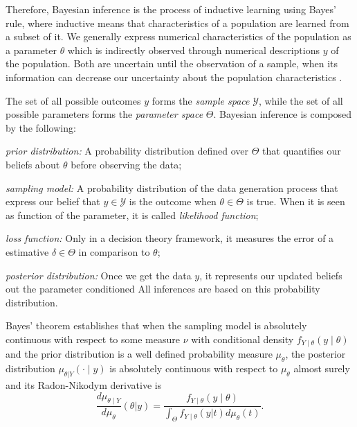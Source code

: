 Therefore, Bayesian inference is the process of inductive learning using
Bayes' rule, where inductive means that characteristics of a population are 
learned from a subset of it. We generally
express numerical characteristics of the population as a parameter $\theta$ which is
indirectly observed through numerical descriptions $y$ of the population. Both are
uncertain until the observation of a sample, when its information can decrease
our uncertainty about the population characteristics \cite[p. 1-2]{hoff2009first}.

The set of all possible outcomes $y$ forms the {\em sample space}
$\mathcal{Y}$, while the set of all possible parameters forms the {\em
parameter space} $\Theta$. Bayesian inference is composed by the following: 

\begin{alineas}
    \item {\em prior distribution:} A probability distribution defined over 
    $\Theta$ that quantifies our beliefs about $\theta$ before observing the data;
    \item {\em sampling model: } A probability distribution of the data generation process
    that express our belief that $y \in \mathcal{Y}$ is the outcome when
    $\theta \in \Theta$ is true. When it is seen as function of the parameter,
    it is called {\em likelihood function};
    \item {\em loss function:} Only in a decision theory framework, it
    measures the error of a estimative $\delta \in \Theta$ in comparison to
    $\theta$;
    \item {\em posterior distribution:} Once we get the data $y$, it
    represents our updated beliefs out the parameter conditioned All
    inferences are based on this probability distribution.
\end{alineas} 

Bayes' theorem establishes that when the sampling model is absolutely
continuous with respect to some measure $\nu$ with conditional density
$f_{Y\mid \theta}(y\mid\theta)$ and the prior distribution is a
well defined probability measure $\mu_{\theta}$, the posterior distribution
$\mu_{\theta|Y}(\cdot\mid y)$ is
absolutely continuous with respect to $\mu_{\theta}$ almost surely and its
Radon-Nikodym derivative is \cite[p. 16]{schervish2012theory}
\begin{equation}
  \label{eq:bayes-update-measure}
  \frac{d\mu_{\theta\mid Y}}{d\mu_{\theta}}(\theta|y) = \frac{f_{Y\mid \theta}(y\mid \theta)}{\int_{\Theta} f_{Y\mid\theta}(y|t)d\mu_{\theta}(t)}.  
\end{equation}

